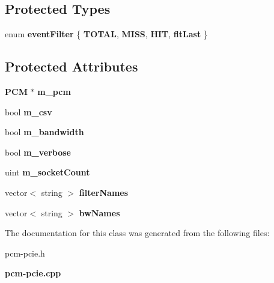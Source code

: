 \subsection*{Protected Types}
\begin{DoxyCompactItemize}
\item 
\mbox{\label{classIPlatform_a9b1e2a11263356b178d54de93ef16a9e}} 
enum {\bfseries event\+Filter} \{ {\bfseries T\+O\+T\+AL}, 
{\bfseries M\+I\+SS}, 
{\bfseries H\+IT}, 
{\bfseries flt\+Last}
 \}
\end{DoxyCompactItemize}
\subsection*{Protected Attributes}
\begin{DoxyCompactItemize}
\item 
\mbox{\label{classIPlatform_afdbbf97f1c56f8ae52c7cf9f16c146b4}} 
\textbf{ P\+CM} $\ast$ {\bfseries m\+\_\+pcm}
\item 
\mbox{\label{classIPlatform_ac902bad50bba120c775c6318ac6c9a55}} 
bool {\bfseries m\+\_\+csv}
\item 
\mbox{\label{classIPlatform_a010b0e35973e9d8e09340f238d23f98a}} 
bool {\bfseries m\+\_\+bandwidth}
\item 
\mbox{\label{classIPlatform_a9f115a7dcb206b31c32ff9a298897900}} 
bool {\bfseries m\+\_\+verbose}
\item 
\mbox{\label{classIPlatform_af08e023a7dd671adf3427a7e234869e1}} 
uint {\bfseries m\+\_\+socket\+Count}
\item 
\mbox{\label{classIPlatform_a3fada52527a9baf452538232058ecbb9}} 
vector$<$ string $>$ {\bfseries filter\+Names}
\item 
\mbox{\label{classIPlatform_a036e2dbbe5d138ede627a168cba0ca2e}} 
vector$<$ string $>$ {\bfseries bw\+Names}
\end{DoxyCompactItemize}


The documentation for this class was generated from the following files\+:\begin{DoxyCompactItemize}
\item 
pcm-\/pcie.\+h\item 
\textbf{ pcm-\/pcie.\+cpp}\end{DoxyCompactItemize}
